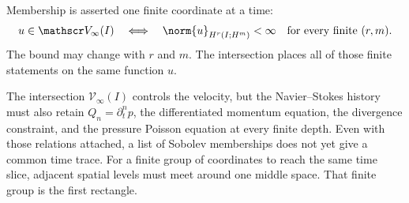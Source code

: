 Membership is asserted one finite coordinate at a time:
\[
  u\in\mathscr V_\infty(I)
  \quad\Longleftrightarrow\quad
  \norm{u}_{H^r(I;H^m)}
  <
  \infty
  \quad
  \text{for every finite }(r,m).
\]
The bound may change with \(r\) and \(m\).
The intersection places all of those finite statements on the same function \(u\).

The intersection \(\mathscr V_\infty(I)\) controls the velocity, but the Navier--Stokes history must also retain \(Q_n=\partial_t^np\), the differentiated momentum equation, the divergence constraint, and the pressure Poisson equation at every finite depth.
Even with those relations attached, a list of Sobolev memberships does not yet give a common time trace.
For a finite group of coordinates to reach the same time slice, adjacent spatial levels must meet around one middle space.
That finite group is the first rectangle.
